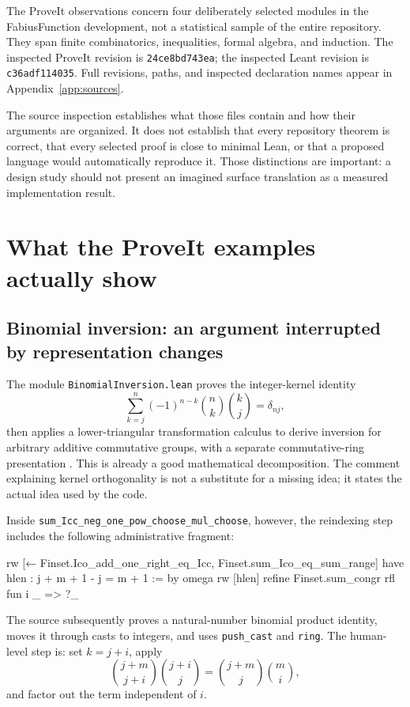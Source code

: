 \documentclass[11pt,a4paper]{article}
\newcommand{\codeid}[1]{\nolinkurl{#1}}
\newcommand{\Pcommit}{\texttt{24ce8bd743ea}}
\newcommand{\Lcommit}{\texttt{c36adf114035}}
\begin{document}
The ProveIt observations concern four deliberately selected modules in the FabiusFunction development, not a statistical sample of the entire repository. They span finite combinatorics, inequalities, formal algebra, and induction. The inspected ProveIt revision is \Pcommit; the inspected Leant revision is \Lcommit. Full revisions, paths, and inspected declaration names appear in Appendix~\ref{app:sources}.

The source inspection establishes what those files contain and how their arguments are organized. It does not establish that every repository theorem is correct, that every selected proof is close to minimal Lean, or that a proposed language would automatically reproduce it. Those distinctions are important: a design study should not present an imagined surface translation as a measured implementation result.

\section{What the ProveIt examples actually show}
\label{sec:evidence}

\subsection{Binomial inversion: an argument interrupted by representation changes}

The module \codeid{BinomialInversion.lean} proves the integer-kernel identity
\begin{equation}\label{eq:orthogonality}
 \sum_{k=j}^{n}(-1)^{n-k}\binom nk\binom kj=\delta_{nj},
\end{equation}
then applies a lower-triangular transformation calculus to derive inversion for arbitrary additive commutative groups, with a separate commutative-ring presentation \cite{srcbinomial}. This is already a good mathematical decomposition. The comment explaining kernel orthogonality is not a substitute for a missing idea; it states the actual idea used by the code.

Inside \codeid{sum_Icc_neg_one_pow_choose_mul_choose}, however, the reindexing step includes the following administrative fragment:
\par\noindent\begin{minipage}{\linewidth}
\begin{rawcode}
rw [← Finset.Ico_add_one_right_eq_Icc,
    Finset.sum_Ico_eq_sum_range]
have hlen : j + m + 1 - j = m + 1 := by omega
rw [hlen]
refine Finset.sum_congr rfl fun i _ => ?_
\end{rawcode}
\end{minipage}\par
The source subsequently proves a natural-number binomial product identity, moves it through casts to integers, and uses \codeid{push_cast} and \codeid{ring}. The human-level step is: set $k=j+i$, apply
\[
 \binom{j+m}{j+i}\binom{j+i}{j}
 =\binom{j+m}{j}\binom mi,
\]
and factor out the term independent of $i$.
\end{document}
